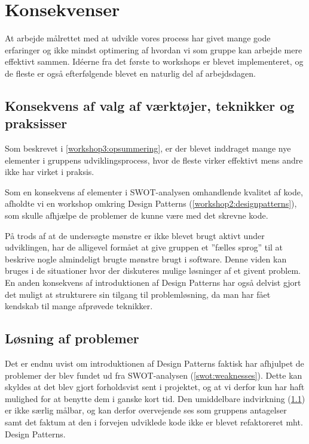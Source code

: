 \section{Konsekvenser}\label{konsekvenser}
At arbejde målrettet med at udvikle vores process har givet mange gode erfaringer og ikke mindst optimering af hvordan vi som gruppe kan arbejde mere effektivt sammen.
Idéerne fra det første to workshops er blevet implementeret, og de fleste er også efterfølgende blevet en naturlig del af arbejdsdagen.

\subsection{Konsekvens af valg af værktøjer, teknikker og praksisser}\label{konsekvens:valg}
Som beskrevet i \cref{workshop3:opsummering}, er der blevet inddraget mange nye elementer i gruppens udviklingsprocess, hvor de fleste virker effektivt mens andre ikke har virket i praksis.

Som en konsekvens af elementer i SWOT-analysen omhandlende kvalitet af kode, afholdte vi en workshop omkring Design Patterns (\cref{workshop2:designpatterns}), som skulle afhjælpe de problemer de kunne være med det skrevne kode.

På trods af at de undersøgte mønstre er ikke blevet brugt aktivt under udviklingen, har de alligevel formået at give gruppen et ''fælles sprog'' til at beskrive nogle almindeligt brugte mønstre brugt i software.
Denne viden kan bruges i de situationer hvor der diskuteres mulige løsninger af et givent problem.
En anden konsekvens af introduktionen af Design Patterns har også delvist gjort det muligt at strukturere sin tilgang til problemløsning, da man har fået kendskab til mange afprøvede teknikker.

\subsection{Løsning af problemer}\label{konsekvens:problemer}
Det er endnu uvist om introduktionen af Design Patterns faktisk har afhjulpet de problemer der blev fundet ud fra SWOT-analysen (\cref{swot:weaknesses}).
Dette kan skyldes at det blev gjort forholdsvist sent i projektet, og at vi derfor kun har haft mulighed for at benytte dem i ganske kort tid.
Den umiddelbare indvirkning (\cref{konsekvens:valg}) er ikke særlig målbar, og kan derfor overvejende ses som gruppens antagelser samt det faktum at den i forvejen udviklede kode ikke er blevet refaktoreret mht. Design Patterns.

